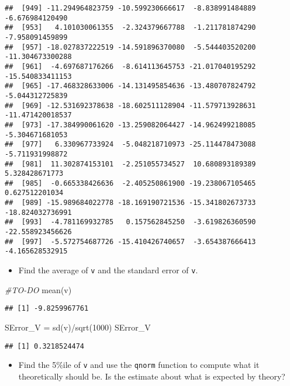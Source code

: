 \documentclass[
]{article}
\newenvironment{Shaded}{\begin{snugshade}}{\end{snugshade}}
\newcommand{\CommentTok}[1]{\textcolor[rgb]{0.56,0.35,0.01}{\textit{#1}}}
\newcommand{\DecValTok}[1]{\textcolor[rgb]{0.00,0.00,0.81}{#1}}
\newcommand{\FunctionTok}[1]{\textcolor[rgb]{0.00,0.00,0.00}{#1}}
\newcommand{\NormalTok}[1]{#1}
\newcommand{\OtherTok}[1]{\textcolor[rgb]{0.56,0.35,0.01}{#1}}
\newcommand{\SpecialCharTok}[1]{\textcolor[rgb]{0.00,0.00,0.00}{#1}}
\providecommand{\tightlist}{%
  \setlength{\itemsep}{0pt}\setlength{\parskip}{0pt}}
\begin{document}
\begin{verbatim}
##  [949] -11.294964823759 -10.599230666617  -8.838991484889  -6.676984120490
##  [953]   4.101030061355  -2.324379667788  -1.211781874290  -7.958091459899
##  [957] -18.027837222519 -14.591896370080  -5.544403520200 -11.304673300288
##  [961]  -4.697687176266  -8.614113645753 -21.017040195292 -15.540833411153
##  [965] -17.468328633006 -14.131495854636 -13.480707824792  -5.044312725839
##  [969] -12.531692378638 -18.602511128904 -11.579713928631 -11.471420018537
##  [973] -17.384990061620 -13.259082064427 -14.962499218085  -5.304671681053
##  [977]   6.330967733924  -5.048218710973 -25.114478473088  -5.711931998872
##  [981]  11.302874153101  -2.251055734527  10.680893189389   5.328428671773
##  [985]  -0.665338426636  -2.405250861900 -19.238067105465   0.627512201034
##  [989] -15.989684022778 -18.169190721536 -15.341802673733 -18.824032736991
##  [993]  -4.781169932785   0.157562845250  -3.619826360590 -22.558923456626
##  [997]  -5.572754687726 -15.410426740657  -3.654387666413  -4.165628532915
\end{verbatim}

\begin{itemize}
\tightlist
\item
  Find the average of \texttt{v} and the standard error of \texttt{v}.
\end{itemize}

\begin{Shaded}
\begin{Highlighting}[]
\CommentTok{\#TO{-}DO}
\FunctionTok{mean}\NormalTok{(v)}
\end{Highlighting}
\end{Shaded}

\begin{verbatim}
## [1] -9.8259967761
\end{verbatim}

\begin{Shaded}
\begin{Highlighting}[]
\NormalTok{SError\_V }\OtherTok{=} \FunctionTok{sd}\NormalTok{(v)}\SpecialCharTok{/}\FunctionTok{sqrt}\NormalTok{(}\DecValTok{1000}\NormalTok{)}
\NormalTok{SError\_V}
\end{Highlighting}
\end{Shaded}

\begin{verbatim}
## [1] 0.3218524474
\end{verbatim}

\begin{itemize}
\tightlist
\item
  Find the 5\%ile of \texttt{v} and use the \texttt{qnorm} function to
  compute what it theoretically should be. Is the estimate about what is
  expected by theory?
\end{itemize}
\end{document}

